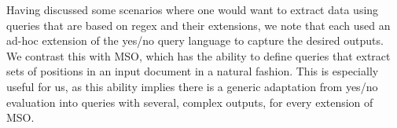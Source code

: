 


Having discussed some scenarios where one would want to extract data using queries that are based on regex and their extensions, we note that each used an ad-hoc extension of the yes/no query language to capture the desired outputs. We contrast this with MSO, which has the ability to define queries that extract sets of positions in an input document in a natural fashion. This is especially useful for us, as this ability implies there is a generic adaptation from yes/no evaluation into queries with several, complex outputs, for every extension of MSO.


